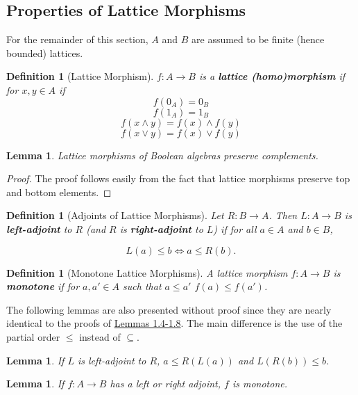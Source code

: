 \documentclass{article}
\newtheorem{lemma}[proposition]{Lemma}
\newtheorem{definition}[proposition]{Definition}
\newcommand{\meet}{\wedge}
\newcommand{\join}{\vee}
\begin{document}
\subsection{Properties of Lattice Morphisms}

For the remainder of this section, $A$ and $B$ are assumed to be finite (hence bounded) lattices. 

\begin{definition}[Lattice Morphism]
$f : A \to B$ is a \textbf{lattice (homo)morphism} if for $x, y \in A$ if $$f(0_A) = 0_B$$ $$f(1_A) = 1_B$$ $$f(x \meet y) = f(x) \meet f(y)$$ $$f(x \join y) = f(x) \join f(y)$$ 
\end{definition}

\begin{lemma}
Lattice morphisms of Boolean algebras preserve complements.
\end{lemma}

\begin{proof}
The proof follows easily from the fact that lattice morphisms preserve top and bottom elements.
\end{proof}

\begin{definition}[Adjoints of Lattice Morphisms]
Let $R : B \to A$. Then $L : A \to B$ is \textbf{left-adjoint} to $R$ (and $R$ is \textbf{right-adjoint} to $L$) if for all $a \in A$ and $b \in B$,

\begin{equation*}
L(a) \leq b \Longleftrightarrow a \leq R(b).
\end{equation*}
\end{definition}

\begin{definition}[Monotone Lattice Morphisms]
A lattice morphism $f : A \to B$ is \textbf{monotone} if for $a, a' \in A$ such that $a \leq a'$ $f(a) \leq f(a')$.
\end{definition}

The following lemmas are also presented without proof since they are nearly identical to the proofs of \hyperref[lem:inv-img-adjoint-lem-1]{Lemmas 1.4-1.8}. The main difference is the use of the partial order $\leq$ instead of $\subseteq$.

\begin{lemma}
If $L$ is left-adjoint to $R$, $a \leq R(L(a))$ and $L(R(b)) \leq b$.
\end{lemma}

\begin{lemma}
If $f : A \to B$ has a left or right adjoint, $f$ is monotone.
\end{lemma}
\end{document}
